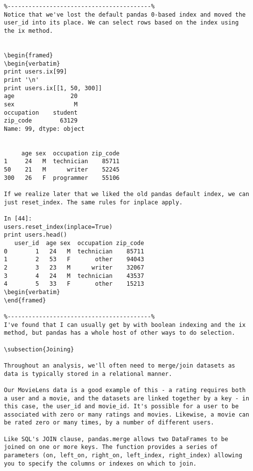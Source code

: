 \begin{framed}
\begin{verbatim}
%-----------------------------------------%
Notice that we've lost the default pandas 0-based index and moved the user_id into its place. We can select rows based on the index using the ix method.


\begin{framed}
\begin{verbatim}
print users.ix[99]
print '\n'
print users.ix[[1, 50, 300]]
age                20
sex                 M
occupation    student
zip_code        63129
Name: 99, dtype: object


     age sex  occupation zip_code
1     24   M  technician    85711
50    21   M      writer    52245
300   26   F  programmer    55106

If we realize later that we liked the old pandas default index, we can just reset_index. The same rules for inplace apply.

In [44]:
users.reset_index(inplace=True)
print users.head()
   user_id  age sex  occupation zip_code
0        1   24   M  technician    85711
1        2   53   F       other    94043
2        3   23   M      writer    32067
3        4   24   M  technician    43537
4        5   33   F       other    15213
\begin{verbatim}
\end{framed}

%-----------------------------------------%
I've found that I can usually get by with boolean indexing and the ix method, but pandas has a whole host of other ways to do selection.

\subsection{Joining}

Throughout an analysis, we'll often need to merge/join datasets as data is typically stored in a relational manner.

Our MovieLens data is a good example of this - a rating requires both a user and a movie, and the datasets are linked together by a key - in this case, the user_id and movie_id. It's possible for a user to be associated with zero or many ratings and movies. Likewise, a movie can be rated zero or many times, by a number of different users.

Like SQL's JOIN clause, pandas.merge allows two DataFrames to be joined on one or more keys. The function provides a series of parameters (on, left_on, right_on, left_index, right_index) allowing you to specify the columns or indexes on which to join.


\end{verbatim}
\end{framed}
